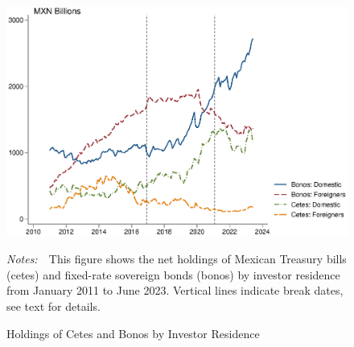 \documentclass[a4paper, 12pt]{article}
\newcommand{\figtext}[1]{
	\vspace{-1ex}
	\captionsetup{justification=justified,font=footnotesize}
	\caption*{#1}
}
\newcommand{\fignotes}[1]{\figtext{\emph{Notes:~}~#1}}
\providecommand{\lastobsflwbdm}{June 2023}
\begin{document}
\begin{appendices}
	\begin{figure}[!htb]
		\caption{Holdings of Cetes and Bonos by Investor Residence} \label{fig:frgvsdomctsbnd}
		\begin{center}
			\begin{minipage}{0.9\linewidth}
				\begin{center}
					\includegraphics[width=1\textwidth,height=.3\textheight]{../Figures/frgvsdomctsbnd} \\
				\end{center}
				\fignotes{This figure shows the net holdings of Mexican Treasury bills (cetes) and fixed-rate sovereign bonds (bonos) by investor residence from January 2011 to \lastobsflwbdm. Vertical lines indicate break dates, see text for details.}
			\end{minipage}
		\end{center}
	\end{figure}
	

\end{appendices}
\end{document}
